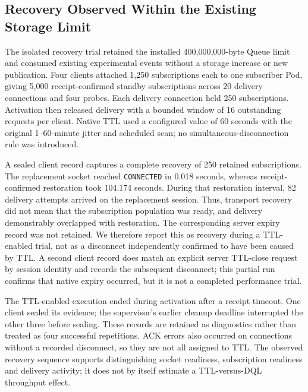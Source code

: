 \subsection{Recovery Observed Within the Existing Storage Limit}

The isolated recovery trial retained the installed 400,000,000-byte Queue
limit and consumed existing experimental events without a storage increase
or new publication. Four clients attached 1,250 subscriptions each to one
subscriber Pod, giving 5,000 receipt-confirmed standby subscriptions across
20 delivery connections and four probes. Each delivery connection held 250
subscriptions. Activation then released delivery with a bounded window of
16 outstanding requests per client. Native TTL used a configured value of
60 seconds with the original 1--60-minute jitter and scheduled scan; no
simultaneous-disconnection rule was introduced.

A sealed client record captures a complete recovery of 250 retained
subscriptions. The replacement socket reached \texttt{CONNECTED} in
0.018 seconds, whereas receipt-confirmed restoration took 104.174 seconds.
During that restoration interval, 82 delivery attempts arrived on the
replacement session. Thus, transport recovery did not mean that the
subscription population was ready, and delivery demonstrably overlapped
with restoration. The corresponding server expiry record was not retained. We therefore report
this as recovery during a TTL-enabled trial, not as a disconnect independently
confirmed to have been caused by TTL. A second client record does match an
explicit server TTL-close request by session identity and records the
subsequent disconnect; this partial run confirms that native expiry occurred, but it is not a
completed performance trial.

The TTL-enabled execution ended during activation after a receipt timeout.
One client sealed its evidence; the supervisor's earlier cleanup deadline
interrupted the other three before sealing. These records are retained as
diagnostics rather than treated as four successful repetitions. ACK errors
also occurred on connections without a recorded disconnect, so they are not
all assigned to TTL. The observed recovery sequence supports distinguishing
socket readiness, subscription readiness and delivery activity; it does not
by itself estimate a TTL-versus-DQL throughput effect.

